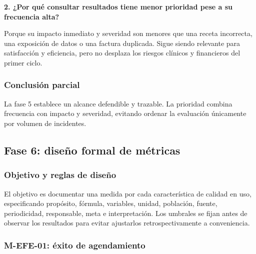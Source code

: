 \textbf{2. ¿Por qué consultar resultados tiene menor prioridad pese a su frecuencia alta?}

Porque su impacto inmediato y severidad son menores que una receta incorrecta, una exposición de datos o una factura duplicada. Sigue siendo relevante para satisfacción y eficiencia, pero no desplaza los riesgos clínicos y financieros del primer ciclo.

\subsubsection{Conclusión parcial}

La fase 5 establece un alcance defendible y trazable. La prioridad combina frecuencia con impacto y severidad, evitando ordenar la evaluación únicamente por volumen de incidentes.



\subsection{Fase 6: diseño formal de métricas}


\subsubsection{Objetivo y reglas de diseño}

El objetivo es documentar una medida por cada característica de calidad en uso, especificando propósito, fórmula, variables, unidad, población, fuente, periodicidad, responsable, meta e interpretación. Los umbrales se fijan antes de observar los resultados para evitar ajustarlos retrospectivamente a conveniencia.

\subsubsection{M-EFE-01: éxito de agendamiento}

